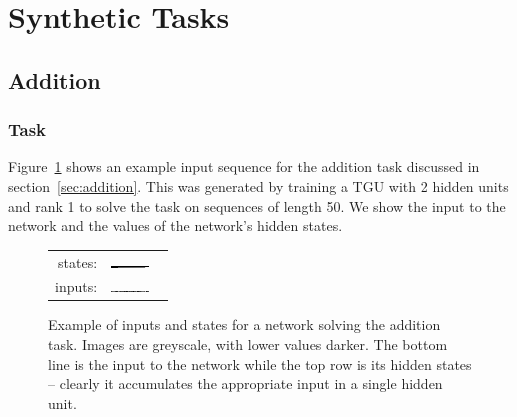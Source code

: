 \section{Synthetic Tasks}
\subsection{Addition}
\subsubsection{Task}
Figure~\ref{fig:additionpics} shows an example input sequence for the addition task discussed in 
section~\ref{sec:addition}. This was generated by training a TGU with 2 hidden units and rank 1
 to solve the
task on sequences of length 50. We show the input to the network and the values of the network's
hidden states.

\begin{figure}
\centering
\begin{tabu} to \textwidth {rX}
states: & \includegraphics[width=0.75\textwidth]{exps/addition/states0} \\
inputs: & \includegraphics[width=0.75\textwidth]{exps/addition/inputs0}
\end{tabu}

\caption[Addition example]{Example of inputs and states for a network solving the addition task.
Images are greyscale, with lower values darker. The bottom line is the input to the network while the
top row is its hidden states -- clearly it accumulates the appropriate input in a single hidden unit.}
\label{fig:additionpics}
\end{figure}

